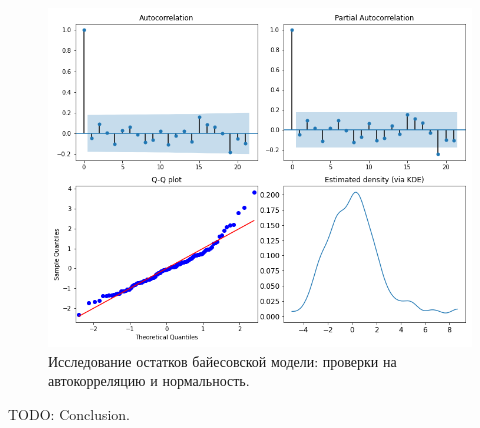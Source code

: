 \documentclass[a4paper,14pt]{extreport}
\begin{document}
\begin{figure}[H]
	\includegraphics[width=\linewidth]{img/gen/pp_ms_arx_resid.png}
	\caption{
		Исследование остатков байесовской модели: 
		проверки на автокорреляцию и нормальность.
	}
	\label{fig:pp_ms_arx_resid}
\end{figure}



TODO: Conclusion.


\printbibliography[title=Список использованных источников]



\end{document}
